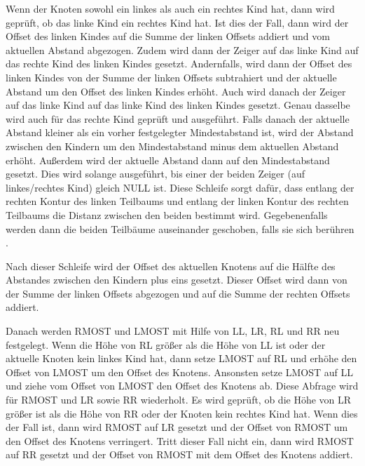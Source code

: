 Wenn der Knoten sowohl ein linkes als auch ein rechtes Kind hat, dann wird geprüft, ob das linke Kind ein rechtes Kind hat. 
Ist dies der Fall, dann wird der Offset des linken Kindes auf die Summe der linken Offsets addiert und vom aktuellen Abstand abgezogen. 
Zudem wird dann der Zeiger auf das linke Kind auf das rechte Kind des linken Kindes gesetzt. Andernfalls, wird dann der Offset des linken 
Kindes von der Summe der linken Offsets subtrahiert und der aktuelle Abstand um den Offset des linken Kindes erhöht. Auch wird danach der 
Zeiger auf das linke Kind auf das linke Kind des linken Kindes gesetzt. Genau dasselbe wird auch für das rechte Kind geprüft und ausgeführt. 
Falls danach der aktuelle Abstand kleiner als ein vorher festgelegter Mindestabstand ist, wird der Abstand zwischen den Kindern um den 
Mindestabstand minus dem aktuellen Abstand erhöht. Außerdem wird der aktuelle Abstand dann auf den Mindestabstand gesetzt. Dies wird solange 
ausgeführt, bis einer der beiden Zeiger (auf linkes/rechtes Kind) gleich NULL ist. Diese Schleife sorgt dafür, dass entlang der rechten 
Kontur des linken Teilbaums und entlang der linken Kontur des rechten Teilbaums die Distanz zwischen den beiden bestimmt wird. 
Gegebenenfalls werden dann die beiden Teilbäume auseinander geschoben, falls sie sich berühren \cite[S. 226]{q2}.

Nach dieser Schleife wird der Offset des aktuellen Knotens auf die Hälfte des Abstandes zwischen den Kindern plus eins gesetzt. 
Dieser Offset wird dann von der Summe der linken Offsets abgezogen und auf die Summe der rechten Offsets addiert. 

Danach werden RMOST und LMOST mit Hilfe von \ac{LL}, \ac{LR}, \ac{RL} und \ac{RR} neu festgelegt. Wenn die Höhe von \ac{RL} größer als die Höhe von \ac{LL} ist oder 
der aktuelle Knoten kein linkes Kind hat, dann setze LMOST auf \ac{RL} und erhöhe den Offset von LMOST um den Offset des Knotens. 
Ansonsten setze LMOST auf \ac{LL} und ziehe vom Offset von LMOST den Offset des Knotens ab. Diese Abfrage wird für RMOST und \ac{LR} sowie \ac{RR} 
wiederholt. Es wird geprüft, ob die Höhe von \ac{LR} größer ist als die Höhe von \ac{RR} oder der Knoten kein rechtes Kind hat. Wenn dies der Fall ist, 
dann wird RMOST auf \ac{LR} gesetzt und der Offset von RMOST um den Offset des Knotens verringert. Tritt dieser Fall nicht ein, dann wird RMOST 
auf \ac{RR} gesetzt und der Offset von RMOST mit dem Offset des Knotens addiert. 

